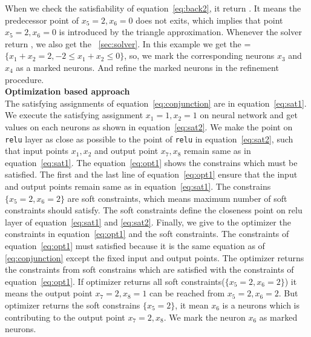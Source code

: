 When we check the satisfiability of equation~\ref{eq:back2}, it return \unsat{}. It means the predecessor point of 
$x_5=2,x_6=0$ does not exits, which implies that point $x_5=2, x_6=0$ is introduced by the triangle approximation.
Whenever the solver return \unsat{}, we also get the \unsatcore{}~\ref{sec:solver}. In this example we get the 
\unsatcore{}=$\{x_1+x_2=2, -2\leq  x_1+x_2 \leq 0\}$, so, we mark the corresponding neurons $x_3$ and $x_4$ as a marked neurons. 
And refine the marked neurons in the refinement procedure. 
\\
\textbf{Optimization based approach}\\
The satisfying assignments of equation~\ref{eq:conjunction} are in equation~\ref{eq:sat1}. 
We execute the satisfying assignment $x_1=1,x_2=1$ on neural network and get values on each neurons as 
shown in equation~\ref{eq:sat2}. We make the point on \texttt{relu} layer as close as possible 
to the point of \texttt{relu} in equation~\ref{eq:sat2}, such that input points $x_1,x_2$ and 
output point $x_7,x_8$ remain same as in equation~\ref{eq:sat1}. 
The equation~\ref{eq:opt1} shows the constrains which must be satisfied. The first and the last line of equation~\ref{eq:opt1}
ensure that the input and output points remain same as in equation~\ref{eq:sat1}. 
The constrains $\{x_5=2, x_6=2\}$ are soft constraints, which means maximum number of soft constraints should satisfy. 
The soft constraints define the closeness point on relu layer of equation~\ref{eq:sat1} and \ref{eq:sat2}. 
Finally, we give to the optimizer the constraints in equation~\ref{eq:opt1} and the soft constraints. 
The constraints of equation~\ref{eq:opt1} must satisfied because it is the same equation as of \ref{eq:conjunction}
except the fixed input and output points. 
The optimizer returns the constraints from soft constrains which are satisfied with the constraints 
of equation~\ref{eq:opt1}. If optimizer returns all soft constraints($\{x_5=2,x_6=2\}$) it means the output point
$x_7=2, x_8=1$ can be reached from $x_5=2,x_6=2$. But optimizer returns the soft constrains $\{x_5=2\}$, it mean 
$x_6$ is a neurons which is contributing to the output point $x_7=2, x_8$. We mark the neuron $x_6$ as 
marked neurons.  

